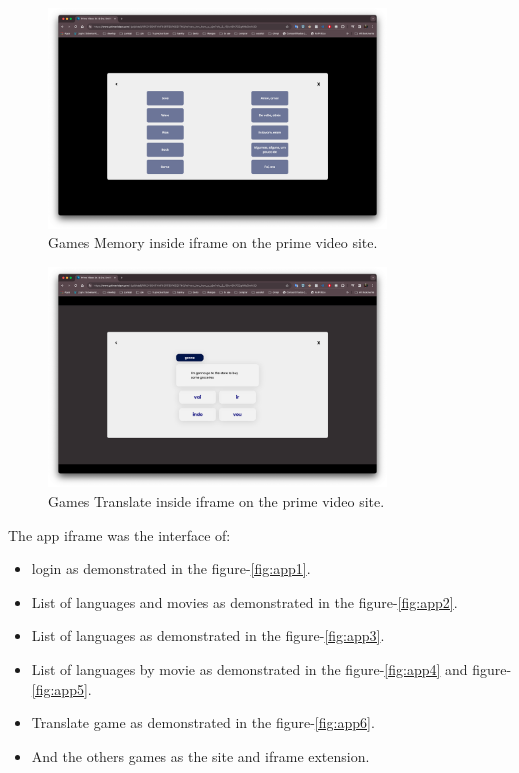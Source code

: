 \documentclass[12pt]{article}
\begin{document}
    \begin{figure}[h]
      \centering
      \caption{
      Games Memory inside iframe on the prime video site.
      }
      \label{fig:iframe3}
      \includegraphics[width=0.8\textwidth]{assets/11.png}
    \end{figure}

    \begin{figure}[h]
      \centering
      \caption{
      Games Translate inside iframe on the prime video site.
      }
      \label{fig:iframe4}
      \includegraphics[width=0.8\textwidth]{assets/12.png}
    \end{figure}



The app iframe was the interface of:

\begin{itemize}
  \item login as demonstrated in the figure-\ref{fig:app1}.
  \item List of languages and movies as demonstrated in the figure-\ref{fig:app2}.
  \item List of languages as demonstrated in the figure-\ref{fig:app3}.
  \item List of languages by movie as demonstrated in the figure-\ref{fig:app4} and figure-\ref{fig:app5}.
  \item Translate game as demonstrated in the figure-\ref{fig:app6}.
  \item And the others games as the site and iframe extension. 
  \end{itemize}
\end{document}

